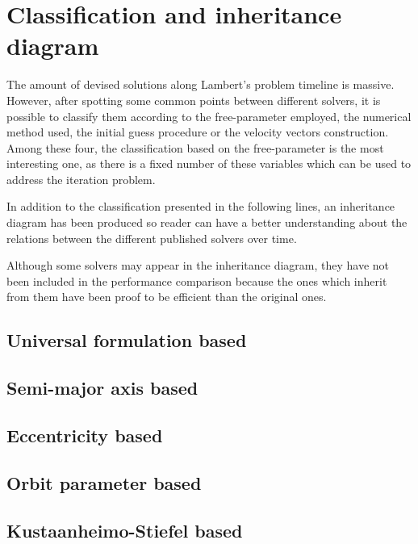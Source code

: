 \section{Classification and inheritance diagram}

The amount of devised solutions along Lambert's problem timeline is massive.
However, after spotting some common points between different solvers, it is
possible to classify them according to the free-parameter employed, the
numerical method used, the initial guess procedure or the velocity vectors
construction. Among these four, the classification based on the free-parameter
is the most interesting one, as there is a fixed number of these variables which
can be used to address the iteration problem.

In addition to the classification presented in the following lines, an
inheritance diagram has been produced so reader can have a better understanding
about the relations between the different published solvers over time.

Although some solvers may appear in the inheritance diagram, they have not been
included in the performance comparison because the ones which inherit from them
have been proof to be efficient than the original ones.

\subsection{Universal formulation based}
\subsection{Semi-major axis based}
\subsection{Eccentricity based}
\subsection{Orbit parameter based}
\subsection{Kustaanheimo-Stiefel based}
